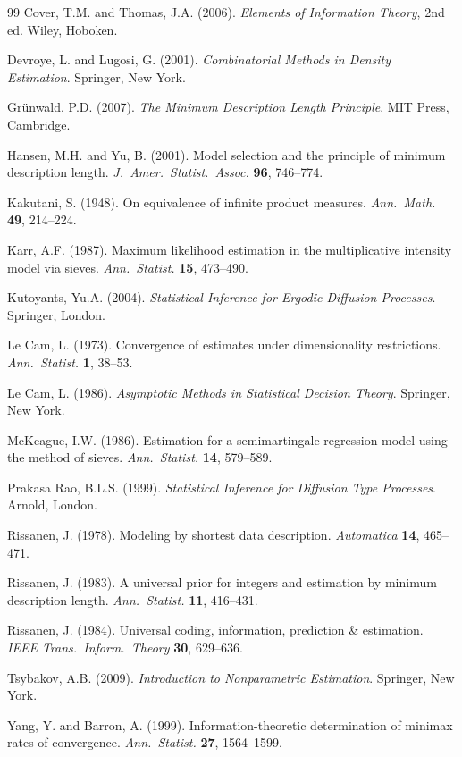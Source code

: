 \documentclass[preprint,review,12pt]{article}
\begin{document}
\begin{thebibliography}{99}
Cover, T.M. and Thomas, J.A. (2006).
\textit{Elements of Information Theory}, 2nd ed.
Wiley, Hoboken.

Devroye, L. and Lugosi, G. (2001).
\textit{Combinatorial Methods in Density Estimation}.
Springer, New York.

Gr\"unwald, P.D. (2007).
\textit{The Minimum Description Length Principle}.
MIT Press, Cambridge.

Hansen, M.H. and Yu, B. (2001).
Model selection and the principle of minimum description length.
\textit{J.\ Amer.\ Statist.\ Assoc.} \textbf{96}, 746--774.

Kakutani, S. (1948).
On equivalence of infinite product measures.
\textit{Ann.\ Math.} \textbf{49}, 214--224.

Karr, A.F. (1987).
Maximum likelihood estimation in the multiplicative intensity model via sieves.
\textit{Ann.\ Statist.} \textbf{15}, 473--490.

Kutoyants, Yu.A. (2004).
\textit{Statistical Inference for Ergodic Diffusion Processes}.
Springer, London.

Le Cam, L. (1973).
Convergence of estimates under dimensionality restrictions.
\textit{Ann.\ Statist.} \textbf{1}, 38--53.

Le Cam, L. (1986).
\textit{Asymptotic Methods in Statistical Decision Theory}.
Springer, New York.

McKeague, I.W. (1986).
Estimation for a semimartingale regression model using the method of sieves.
\textit{Ann.\ Statist.} \textbf{14}, 579--589.

Prakasa Rao, B.L.S. (1999).
\textit{Statistical Inference for Diffusion Type Processes}.
Arnold, London.

Rissanen, J. (1978).
Modeling by shortest data description.
\textit{Automatica} \textbf{14}, 465--471.

Rissanen, J. (1983).
A universal prior for integers and estimation by minimum description length.
\textit{Ann.\ Statist.} \textbf{11}, 416--431.

Rissanen, J. (1984).
Universal coding, information, prediction \& estimation.
\textit{IEEE Trans.\ Inform.\ Theory} \textbf{30}, 629--636.

Tsybakov, A.B. (2009).
\textit{Introduction to Nonparametric Estimation}.
Springer, New York.

Yang, Y. and Barron, A. (1999).
Information-theoretic determination of minimax rates of convergence.
\textit{Ann.\ Statist.} \textbf{27}, 1564--1599.

\end{thebibliography}
\end{document}
